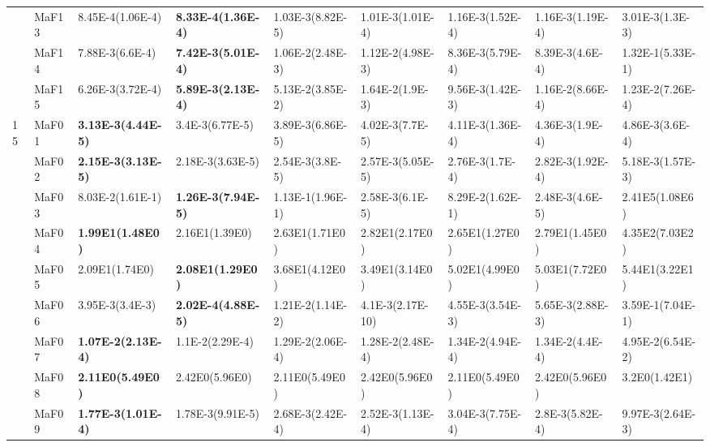 \documentclass[]{article}
\begin{document}
\begin{landscape}
\begin{table}
\begin{footnotesize}
\begin{tabular}{|l|l|l|l|l|l|l|l|l|}
 & MaF13 & \cellcolor{gray95} 8.45E-4(1.06E-4) & \cellcolor{gray95} {\bf 8.33E-4(1.36E-4)} & 1.03E-3(8.82E-5) & \cellcolor{gray95} 1.01E-3(1.01E-4) & 1.16E-3(1.52E-4) & 1.16E-3(1.19E-4) & 3.01E-3(1.3E-3)\\
 & MaF14 & \cellcolor{gray95} 7.88E-3(6.6E-4) & \cellcolor{gray95} {\bf 7.42E-3(5.01E-4)} & 1.06E-2(2.48E-3) & 1.12E-2(4.98E-3) & \cellcolor{gray95} 8.36E-3(5.79E-4) & \cellcolor{gray95} 8.39E-3(4.6E-4) & 1.32E-1(5.33E-1)\\
 & MaF15 & \cellcolor{gray95} 6.26E-3(3.72E-4) & \cellcolor{gray95} {\bf 5.89E-3(2.13E-4)} & 5.13E-2(3.85E-2) & 1.64E-2(1.9E-3) & 9.56E-3(1.42E-3) & 1.16E-2(8.66E-4) & 1.23E-2(7.26E-4)\\
\hline

\multirow{15}{*}{15} & MaF01 & \cellcolor{gray95} {\bf 3.13E-3(4.44E-5)} & \cellcolor{gray95} 3.4E-3(6.77E-5) & 3.89E-3(6.86E-5) & 4.02E-3(7.7E-5) & 4.11E-3(1.36E-4) & 4.36E-3(1.9E-4) & 4.86E-3(3.6E-4)\\
 & MaF02 & \cellcolor{gray95} {\bf 2.15E-3(3.13E-5)} & \cellcolor{gray95} 2.18E-3(3.63E-5) & 2.54E-3(3.8E-5) & 2.57E-3(5.05E-5) & 2.76E-3(1.7E-4) & 2.82E-3(1.92E-4) & 5.18E-3(1.57E-3)\\
 & MaF03 & 8.03E-2(1.61E-1) & \cellcolor{gray95} {\bf 1.26E-3(7.94E-5)} & 1.13E-1(1.96E-1) & 2.58E-3(6.1E-5) & 8.29E-2(1.62E-1) & 2.48E-3(4.6E-5) & 2.41E5(1.08E6)\\
 & MaF04 & \cellcolor{gray95} {\bf 1.99E1(1.48E0)} & \cellcolor{gray95} 2.16E1(1.39E0) & 2.63E1(1.71E0) & 2.82E1(2.17E0) & 2.65E1(1.27E0) & 2.79E1(1.45E0) & 4.35E2(7.03E2)\\
 & MaF05 & \cellcolor{gray95} 2.09E1(1.74E0) & \cellcolor{gray95} {\bf 2.08E1(1.29E0)} & 3.68E1(4.12E0) & 3.49E1(3.14E0) & 5.02E1(4.99E0) & 5.03E1(7.72E0) & 5.44E1(3.22E1)\\
 & MaF06 & 3.95E-3(3.4E-3) & \cellcolor{gray95} {\bf 2.02E-4(4.88E-5)} & 1.21E-2(1.14E-2) & 4.1E-3(2.17E-10) & 4.55E-3(3.54E-3) & 5.65E-3(2.88E-3) & 3.59E-1(7.04E-1)\\
 & MaF07 & \cellcolor{gray95} {\bf 1.07E-2(2.13E-4)} & \cellcolor{gray95} 1.1E-2(2.29E-4) & 1.29E-2(2.06E-4) & 1.28E-2(2.48E-4) & 1.34E-2(4.94E-4) & 1.34E-2(4.4E-4) & 4.95E-2(6.54E-2)\\
 & MaF08 & \cellcolor{gray95} {\bf 2.11E0(5.49E0)} & \cellcolor{gray95} 2.42E0(5.96E0) & \cellcolor{gray95} 2.11E0(5.49E0) & \cellcolor{gray95} 2.42E0(5.96E0) & 2.11E0(5.49E0) & 2.42E0(5.96E0) & 3.2E0(1.42E1)\\
 & MaF09 & \cellcolor{gray95} {\bf 1.77E-3(1.01E-4)} & \cellcolor{gray95} 1.78E-3(9.91E-5) & 2.68E-3(2.42E-4) & 2.52E-3(1.13E-4) & 3.04E-3(7.75E-4) & 2.8E-3(5.82E-4) & 9.97E-3(2.64E-3)\\

\end{tabular}
\end{footnotesize}
\end{table}
\end{landscape}
\end{document}
